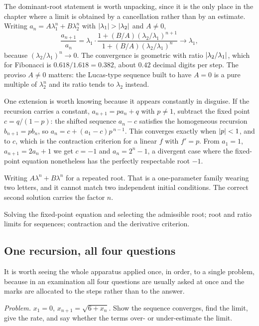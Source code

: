 The dominant-root statement is worth unpacking, since it is the only place in the chapter where a limit is obtained by a cancellation rather than by an estimate. Writing $a_n=A\lambda_1^n+B\lambda_2^n$ with $\left\lvert \lambda_1\right\rvert>\left\lvert \lambda_2\right\rvert$ and $A\neq0$,
\[\frac{a_{n+1}}{a_n}=\lambda_1\cdot\frac{1+(B/A)(\lambda_2/\lambda_1)^{n+1}}{1+(B/A)(\lambda_2/\lambda_1)^{n}}\longrightarrow\lambda_1,\]
because $(\lambda_2/\lambda_1)^n\to0$. The convergence is geometric with ratio $\left\lvert \lambda_2/\lambda_1\right\rvert$, which for Fibonacci is $0.618/1.618=0.382$, about $0.42$ decimal digits per step. The proviso $A\neq0$ matters: the Lucas-type sequence built to have $A=0$ is a pure multiple of $\lambda_2^n$ and its ratio tends to $\lambda_2$ instead.

One extension is worth knowing because it appears constantly in disguise. If the recursion carries a constant, $a_{n+1}=pa_n+q$ with $p\neq1$, subtract the fixed point $c=q/(1-p)$: the shifted sequence $a_n-c$ satisfies the homogeneous recursion $b_{n+1}=pb_n$, so $a_n=c+(a_1-c)p^{\,n-1}$. This converges exactly when $\left\lvert p\right\rvert<1$, and to $c$, which is the contraction criterion for a linear $f$ with $f'=p$. From $a_1=1$, $a_{n+1}=2a_n+1$ we get $c=-1$ and $a_n=2^n-1$, a divergent case where the fixed-point equation nonetheless has the perfectly respectable root $-1$.

\begin{trap}
Writing $A\lambda^n+B\lambda^n$ for a repeated root. That is a one-parameter family wearing two letters, and it cannot match two independent initial conditions. The correct second solution carries the factor $n$.
\end{trap}

\begin{seealsob}Solving the fixed-point equation and selecting the admissible root; root and ratio limits for sequences; contraction and the derivative criterion.\end{seealsob}

\subsection{One recursion, all four questions}

It is worth seeing the whole apparatus applied once, in order, to a single problem, because in an examination all four questions are usually asked at once and the marks are allocated to the steps rather than to the answer.

\emph{Problem.} $x_1=0$, $x_{n+1}=\sqrt{6+x_n}$. Show the sequence converges, find the limit, give the rate, and say whether the terms over- or under-estimate the limit.

